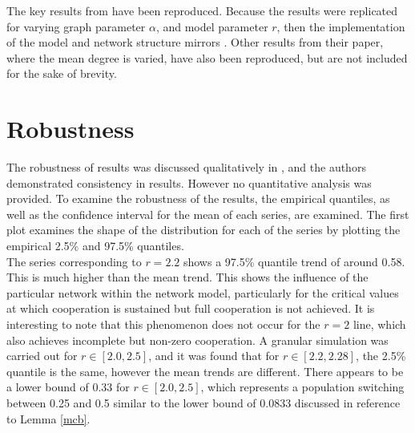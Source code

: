 The key results from \cite{RN49} have been reproduced. Because the results were replicated for varying graph parameter $\alpha$, and model parameter $r$, then the implementation of the model and network structure mirrors \cite{RN49}. Other results from their paper, where the mean degree is varied, have also been reproduced, but are not included for the sake of brevity.\\


\section{Robustness}
The robustness of results was discussed qualitatively in \cite{RN49}, and the authors demonstrated consistency in results. However no quantitative analysis was provided. To examine the robustness of the results, the empirical quantiles, as well as the confidence interval for the mean of each series, are examined. The first plot examines the shape of the distribution for each of the series by plotting the empirical 2.5\% and 97.5\% quantiles. \\

\FloatBarrier
{}
\FloatBarrier
The series corresponding to $r=2.2$ shows a 97.5\% quantile trend of around 0.58. This is much higher than the mean trend. This shows the influence of the particular network within the network model, particularly for the critical values at which cooperation is sustained but full cooperation is not achieved. It is interesting to note that this phenomenon does not occur for the $r=2$ line, which also achieves incomplete but non-zero cooperation. A granular simulation was carried out for $r \in [2.0,2.5]$, and it was found that for $r \in [2.2, 2.28]$, the 2.5\% quantile is the same, however the mean trends are different. There appears to be a lower bound of 0.33 for $r \in [2.0, 2.5]$, which represents a population switching between 0.25 and 0.5 similar to the lower bound of 0.0833 discussed in reference to Lemma \ref{mcb}.\\

